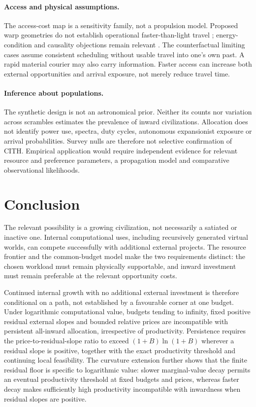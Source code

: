 \documentclass[11pt,a4paper]{article}
\theoremstyle{definition}\newtheorem{definition}{Definition}
\newcommand{\CITH}{\textsc{CITH}}
\begin{document}
\paragraph{Access and physical assumptions.}
The access-cost map is a sensitivity family, not a propulsion model.
Proposed warp geometries do not establish operational faster-than-light
travel \citep{Alcubierre1994}; energy-condition and causality objections
remain relevant \citep{Everett1996,Santiago2022}. The counterfactual
limiting cases assume consistent scheduling without usable travel into
one's own past. A rapid material courier may also carry information.
Faster access can increase both external opportunities and arrival
exposure, not merely reduce travel time.

\paragraph{Inference about populations.}
The synthetic design is not an astronomical prior. Neither its counts nor
variation across scrambles estimates the prevalence of inward civilizations.
Allocation does not identify power use, spectra, duty cycles, autonomous
expansionist exposure or arrival probabilities. Survey nulls are therefore
not selective confirmation of \CITH. Empirical application would require
independent evidence for relevant resource and preference parameters,
a propagation model and comparative observational likelihoods.

\section{Conclusion}
The relevant possibility is a growing civilization, not necessarily a
satiated or inactive one. Internal computational uses, including recursively
generated virtual worlds, can compete successfully with additional external
projects. The resource frontier and the common-budget model make the two
requirements distinct: the chosen workload must remain physically
supportable, and inward investment must remain preferable at the relevant
opportunity costs.

Continued internal growth with no additional external investment is
therefore conditional on a path, not established by a favourable corner
at one budget. Under logarithmic computational value, budgets tending to
infinity, fixed positive residual external slopes and bounded relative
prices are incompatible with persistent all-inward allocation, irrespective
of productivity. Persistence requires the price-to-residual-slope ratio to
exceed $(1+B)\ln(1+B)$ wherever a residual slope is positive, together
with the exact productivity threshold and continuing local feasibility.
The curvature extension further shows that the finite residual floor is
specific to logarithmic value: slower marginal-value decay permits an
eventual productivity threshold at fixed budgets and prices, whereas
faster decay makes sufficiently high productivity incompatible with
inwardness when residual slopes are positive.
\end{document}
